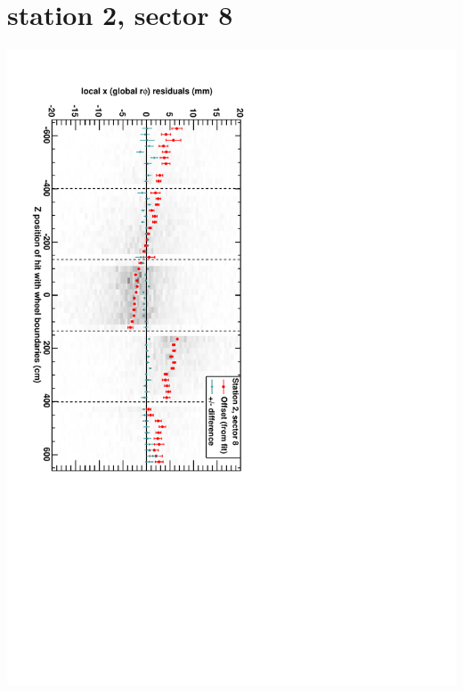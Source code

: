 \documentclass[compress]{beamer}
\begin{document}
\section*{station 2, sector 8}
\begin{frame} \vfill \mbox{\hspace{-1 cm}\includegraphics[height=1.2\linewidth, angle=90]{DTrphiVsZ_st2_sr08.pdf}} \end{frame}
\end{document}
